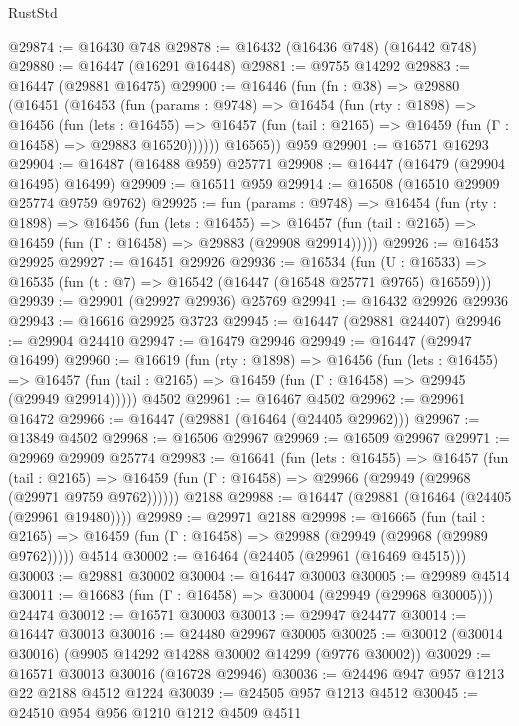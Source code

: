 \begin{lexlean}{RustStd}
\begin{coremodule}
@29874 := @16430 @748
@29878 := @16432 (@16436 @748) (@16442 @748)
@29880 := @16447 (@16291 @16448)
@29881 := @9755 @14292
@29883 := @16447 (@29881 @16475)
@29900 := @16446
    (fun (fn : @38) =>
    @29880
      (@16451
        (@16453
          (fun (params : @9748) =>
          @16454
            (fun (rty : @1898) =>
            @16456
              (fun (lets : @16455) =>
              @16457 (fun (tail : @2165) => @16459 (fun (Γ : @16458) => @29883 @16520))))))
        @16565))
    @959
@29901 := @16571 @16293
@29904 := @16487 (@16488 @959) @25771
@29908 := @16447 (@16479 (@29904 @16495) @16499)
@29909 := @16511 @959
@29914 := @16508 (@16510 @29909 @25774 @9759 @9762)
@29925 := fun (params : @9748) =>
  @16454
    (fun (rty : @1898) =>
    @16456
      (fun (lets : @16455) =>
      @16457 (fun (tail : @2165) => @16459 (fun (Γ : @16458) => @29883 (@29908 @29914)))))
@29926 := @16453 @29925
@29927 := @16451 @29926
@29936 := @16534
    (fun (U : @16533) => @16535 (fun (t : @7) => @16542 (@16447 (@16548 @25771 @9765) @16559)))
@29939 := @29901 (@29927 @29936) @25769
@29941 := @16432 @29926 @29936
@29943 := @16616 @29925 @3723
@29945 := @16447 (@29881 @24407)
@29946 := @29904 @24410
@29947 := @16479 @29946
@29949 := @16447 (@29947 @16499)
@29960 := @16619
    (fun (rty : @1898) =>
    @16456
      (fun (lets : @16455) =>
      @16457 (fun (tail : @2165) => @16459 (fun (Γ : @16458) => @29945 (@29949 @29914)))))
    @4502
@29961 := @16467 @4502
@29962 := @29961 @16472
@29966 := @16447 (@29881 (@16464 (@24405 @29962)))
@29967 := @13849 @4502
@29968 := @16506 @29967
@29969 := @16509 @29967
@29971 := @29969 @29909 @25774
@29983 := @16641
    (fun (lets : @16455) =>
    @16457
      (fun (tail : @2165) =>
      @16459 (fun (Γ : @16458) => @29966 (@29949 (@29968 (@29971 @9759 @9762))))))
    @2188
@29988 := @16447 (@29881 (@16464 (@24405 (@29961 @19480))))
@29989 := @29971 @2188
@29998 := @16665
    (fun (tail : @2165) => @16459 (fun (Γ : @16458) => @29988 (@29949 (@29968 (@29989 @9762)))))
    @4514
@30002 := @16464 (@24405 (@29961 (@16469 @4515)))
@30003 := @29881 @30002
@30004 := @16447 @30003
@30005 := @29989 @4514
@30011 := @16683 (fun (Γ : @16458) => @30004 (@29949 (@29968 @30005))) @24474
@30012 := @16571 @30003
@30013 := @29947 @24477
@30014 := @16447 @30013
@30016 := @24480 @29967 @30005
@30025 := @30012 (@30014 @30016) (@9905 @14292 @14288 @30002 @14299 (@9776 @30002))
@30029 := @16571 @30013 @30016 (@16728 @29946)
@30036 := @24496 @947 @957 @1213 @22 @2188 @4512 @1224
@30039 := @24505 @957 @1213 @4512
@30045 := @24510 @954 @956 @1210 @1212 @4509 @4511

\end{coremodule}
\end{lexlean}
